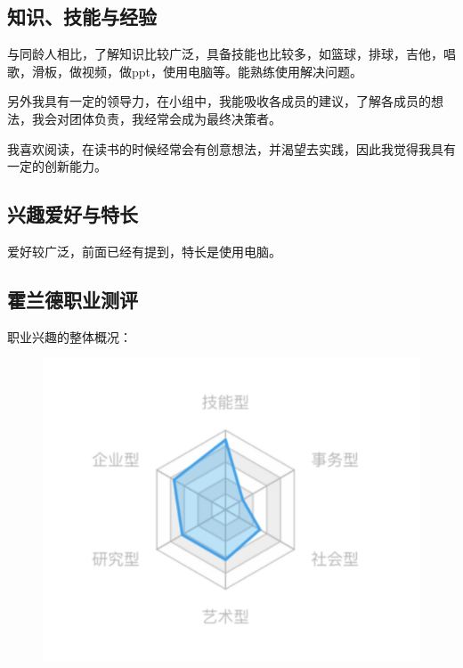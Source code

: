 \documentclass{article}
\begin{document}
\subsection{知识、技能与经验}
与同龄人相比，了解知识比较广泛，具备技能也比较多，如篮球，排球，吉他，唱歌，滑板，做视频，做ppt，使用电脑等。能熟练使用解决问题。\par
另外我具有一定的领导力，在小组中，我能吸收各成员的建议，了解各成员的想法，我会对团体负责，我经常会成为最终决策者。\par
我喜欢阅读，在读书的时候经常会有创意想法，并渴望去实践，因此我觉得我具有一定的创新能力。\par
\subsection{兴趣爱好与特长}
爱好较广泛，前面已经有提到，特长是使用电脑。\par
\subsection{霍兰德职业测评}
职业兴趣的整体概况：
\begin{figure}[H]
	\centering
	\includegraphics[width=0.7\linewidth]{图片1}
	\caption{}
	\label{fig:1}
\end{figure}
\end{document}
